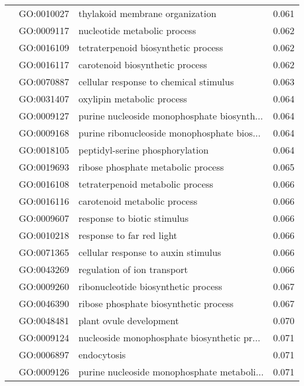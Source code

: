 \begin{longtable}{lllr}
   & GO:0010027 &              thylakoid membrane organization &         0.061 \\
   & GO:0009117 &                 nucleotide metabolic process &         0.062 \\
   & GO:0016109 &          tetraterpenoid biosynthetic process &         0.062 \\
   & GO:0016117 &              carotenoid biosynthetic process &         0.062 \\
   & GO:0070887 &       cellular response to chemical stimulus &         0.063 \\
   & GO:0031407 &                   oxylipin metabolic process &         0.064 \\
   & GO:0009127 &  purine nucleoside monophosphate biosynth... &         0.064 \\
   & GO:0009168 &  purine ribonucleoside monophosphate bios... &         0.064 \\
   & GO:0018105 &              peptidyl-serine phosphorylation &         0.064 \\
   & GO:0019693 &           ribose phosphate metabolic process &         0.065 \\
   & GO:0016108 &             tetraterpenoid metabolic process &         0.066 \\
   & GO:0016116 &                 carotenoid metabolic process &         0.066 \\
   & GO:0009607 &                  response to biotic stimulus &         0.066 \\
   & GO:0010218 &                    response to far red light &         0.066 \\
   & GO:0071365 &          cellular response to auxin stimulus &         0.066 \\
   & GO:0043269 &                  regulation of ion transport &         0.066 \\
   & GO:0009260 &          ribonucleotide biosynthetic process &         0.067 \\
   & GO:0046390 &        ribose phosphate biosynthetic process &         0.067 \\
   & GO:0048481 &                      plant ovule development &         0.070 \\
   & GO:0009124 &  nucleoside monophosphate biosynthetic pr... &         0.071 \\
   & GO:0006897 &                                  endocytosis &         0.071 \\
   & GO:0009126 &  purine nucleoside monophosphate metaboli... &         0.071 \\

\end{longtable}
